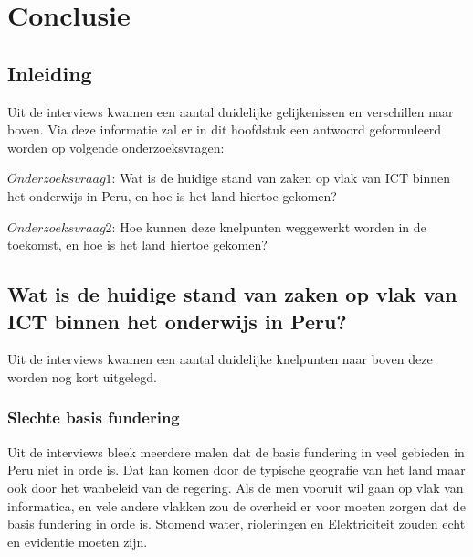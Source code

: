 
\chapter{Conclusie}
\label{ch:conclusie}


\section{Inleiding}
Uit de interviews kwamen een aantal duidelijke gelijkenissen en verschillen naar boven. Via deze informatie zal er in dit hoofdstuk een antwoord geformuleerd worden op volgende onderzoeksvragen:

$Onderzoeksvraag 1$: Wat is de huidige stand van zaken op vlak van ICT binnen het onderwijs in Peru, en hoe is het land hiertoe gekomen?

$Onderzoeksvraag 2$: Hoe kunnen deze knelpunten weggewerkt worden in de toekomst, en hoe is het land hiertoe gekomen?

\section{Wat is de huidige stand van zaken op vlak van ICT binnen het onderwijs in Peru?}
Uit de interviews kwamen een aantal duidelijke knelpunten naar boven deze worden nog kort uitgelegd.



\subsection{Slechte basis fundering}
Uit de interviews bleek meerdere malen dat de basis fundering in veel gebieden in Peru niet in orde is. Dat kan komen door de typische geografie van het land maar ook door het wanbeleid van de regering. Als de men vooruit wil gaan op vlak van informatica, en vele andere vlakken zou de overheid  er voor moeten zorgen dat de basis fundering in orde is. Stomend water, rioleringen en Elektriciteit zouden echt en evidentie moeten zijn.

